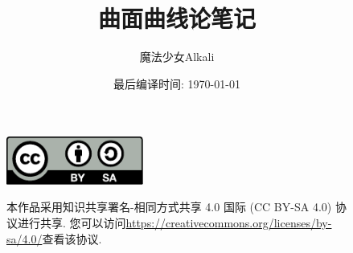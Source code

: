 \documentclass[11pt]{book}
\title{曲面曲线论笔记}
\author{魔法少女Alkali}
\affil{北京师范大学数学科学学院}
\date{最后编译时间: \today}
\numberwithin{equation}{section}
\theoremstyle{definition}
\theoremstyle{plain}
\theoremstyle{remark}
\begin{document}
    \maketitle
    \vspace*{13cm}
    \thispagestyle{empty}
    \begin{figure}[ht]
        \includegraphics[width=0.4\textwidth]{by-sa.pdf}\hspace{0.05\textwidth}
        \begin{minipage}[b]{0.54\textwidth} %
        \small
        本作品采用知识共享署名-相同方式共享 4.0 国际 (CC BY-SA 4.0) 协议进行共享.
        您可以访问\url{https://creativecommons.org/licenses/by-sa/4.0/}查看该协议.
        \end{minipage}
    \end{figure}

    \frontmatter
    

    \tableofcontents

    \mainmatter
    
    
    
    

    \appendix
    \printbibliography[title={参考文献},heading=bibintoc]
\end{document}
